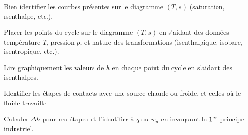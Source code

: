 \documentclass[12pt,fancy]{cours}
\begin{document}
\begin{methode}
  \item Bien identifier les courbes présentes sur le diagramme $(T,s)$ (saturation, isenthalpe, etc.).
  \item Placer les points du cycle sur le diagramme $(T,s)$ en s'aidant des données : température $T$, pression $p$, et nature des transformations (isenthalpique, isobare, isentropique, etc.).
  \item Lire graphiquement les valeurs de $h$ en chaque point du cycle en s'aidant des isenthalpes.
  \item Identifier les étapes de contacts avec une source chaude ou froide, et celles où le fluide travaille.
  \item Calculer $\Delta h$ pour ces étapes et l'identifier à $q$ ou $w_u$ en invoquant le
  $1^{\rm er}$ principe industriel.
\end{methode}
\end{document}
